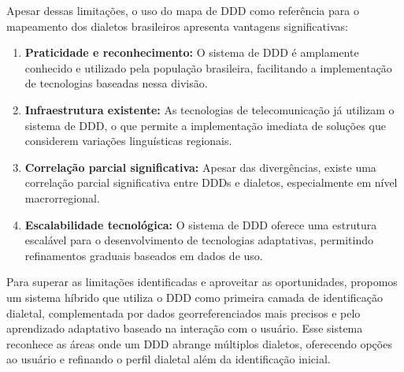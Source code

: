 Apesar dessas limitações, o uso do mapa de DDD como referência para o mapeamento dos dialetos brasileiros apresenta vantagens significativas:
\begin{enumerate}
    \item \textbf{Praticidade e reconhecimento:} O sistema de DDD é amplamente conhecido e utilizado pela população brasileira, facilitando a implementação de tecnologias baseadas nessa divisão.
    \item \textbf{Infraestrutura existente:} As tecnologias de telecomunicação já utilizam o sistema de DDD, o que permite a implementação imediata de soluções que considerem variações linguísticas regionais.
    \item \textbf{Correlação parcial significativa:} Apesar das divergências, existe uma correlação parcial significativa entre DDDs e dialetos, especialmente em nível macrorregional.
    \item \textbf{Escalabilidade tecnológica:} O sistema de DDD oferece uma estrutura escalável para o desenvolvimento de tecnologias adaptativas, permitindo refinamentos graduais baseados em dados de uso.
\end{enumerate}
Para superar as limitações identificadas e aproveitar as oportunidades, propomos um sistema híbrido que utiliza o DDD como primeira camada de identificação dialetal, complementada por dados georreferenciados mais precisos e pelo aprendizado adaptativo baseado na interação com o usuário. Esse sistema reconhece as áreas onde um DDD abrange múltiplos dialetos, oferecendo opções ao usuário e refinando o perfil dialetal além da identificação inicial.


